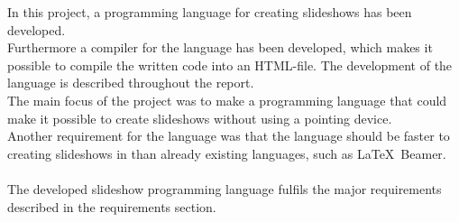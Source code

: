 
In this project, a programming language for creating slideshows has been developed. \\
Furthermore a compiler for the language has been developed, which makes it possible to compile the written code into an HTML-file. The development of the language is described throughout the report. \\
The main focus of the project was to make a programming language that could make it possible to create slideshows without using a pointing device. \\
Another requirement for the language was that the language should be faster to creating slideshows in than already existing languages, such as \LaTeX~Beamer.
\\ \\
The developed slideshow programming language fulfils the major requirements described in the requirements section.